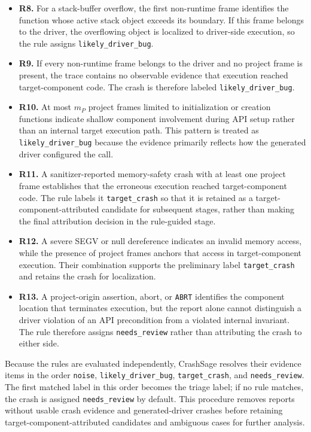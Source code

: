 \documentclass[pdflatex,sn-basic]{sn-jnl}%
\theoremstyle{thmstyleone}%
\theoremstyle{thmstyletwo}%
\theoremstyle{thmstylethree}%
\begin{document}
\begin{itemize}
    \item \textbf{R8.} For a stack-buffer overflow, the first non-runtime frame identifies the function whose active stack object exceeds its boundary. If this frame belongs to the driver, the overflowing object is localized to driver-side execution, so the rule assigns \texttt{likely\_driver\_bug}.
    \item \textbf{R9.} If every non-runtime frame belongs to the driver and no project frame is present, the trace contains no observable evidence that execution reached target-component code. The crash is therefore labeled \texttt{likely\_driver\_bug}.
    \item \textbf{R10.} At most \(m_P\) project frames limited to initialization or creation functions indicate shallow component involvement during API setup rather than an internal target execution path. This pattern is treated as \texttt{likely\_driver\_bug} because the evidence primarily reflects how the generated driver configured the call.
    \item \textbf{R11.} A sanitizer-reported memory-safety crash with at least one project frame establishes that the erroneous execution reached target-component code. The rule labels it \texttt{target\_crash} so that it is retained as a target-component-attributed candidate for subsequent stages, rather than making the final attribution decision in the rule-guided stage.
    \item \textbf{R12.} A severe SEGV or null dereference indicates an invalid memory access, while the presence of project frames anchors that access in target-component execution. Their combination supports the preliminary label \texttt{target\_crash} and retains the crash for localization.
    \item \textbf{R13.} A project-origin assertion, abort, or \texttt{ABRT} identifies the component location that terminates execution, but the report alone cannot distinguish a driver violation of an API precondition from a violated internal invariant. The rule therefore assigns \texttt{needs\_review} rather than attributing the crash to either side.
\end{itemize}

Because the rules are evaluated independently, CrashSage resolves their evidence items in the order \texttt{noise}, \texttt{likely\_driver\_bug}, \texttt{target\_crash}, and \texttt{needs\_review}.
The first matched label in this order becomes the triage label; if no rule matches, the crash is assigned \texttt{needs\_review} by default.
This procedure removes reports without usable crash evidence and generated-driver crashes before retaining target-component-attributed candidates and ambiguous cases for further analysis.
\end{document}
